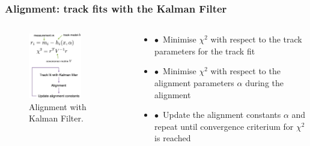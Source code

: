 \documentclass[aspectratio=1610, 12pt]{beamer}
\begin{document}
\begin{frame}\frametitle{Alignment: track fits with the Kalman Filter}
  \begin{columns}
    \begin{column}[c]{0.48\textwidth}
      \begin{figure}
        \centering
        \includegraphics[width=0.7\textwidth]{logos/kalman.png}
        \caption{Alignment with Kalman Filter.}
      \end{figure}
    \end{column}
    \begin{column}[c]{0.48\textwidth}
      \begin{itemize}
        \item $\bullet$\, Minimise $\chi^2$ with respect to the track parameters for the track fit
        \item $\bullet$\, Minimise $\chi^2$ with respect to the alignment parameters $\alpha$ during the alignment
        \item $\bullet$\, Update the alignment constants $\alpha$ and repeat until convergence criterium for $\chi^2$ is reached
      \end{itemize}
    \end{column}
  \end{columns}
\end{frame}
\end{document}

